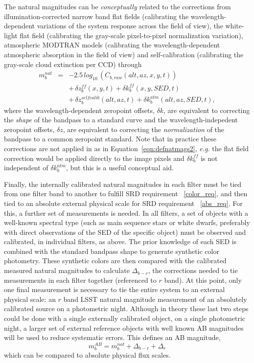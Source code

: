 \documentclass[12pt,preprint]{aastex}
\begin{document}
The natural magnitudes can be {\it conceptually} related to the corrections
from illumination-corrected narrow band flat fields (calibrating the
wavelength-dependent variations of the system response across the
field of view), the white-light flat field (calibrating the gray-scale pixel-to-pixel
normalization variation), atmospheric MODTRAN models (calibrating the
wavelength-dependent atmospheric absorption in the field of view) and
self-calibration (calibrating the gray-scale cloud extinction per CCD)
through
\begin{eqnarray}
\label{eqn:defnatmags2}
m_b^{nat} & = &-2.5 \, log_{10} \, (C_{b, raw}(alt,az,x,y,t))
\nonumber \\ 
 & & +\, \delta z_b^{ff}(x,y,t) + \delta k_b^{ff}(x,y,SED,t)  \nonumber \\  
 & &+\, \delta z_b^{selfcalib}(alt,az,t)  + \delta k_b^{atm}(alt,az,SED,t), 
\end{eqnarray}
where the wavelength-dependent zeropoint offsets, $\delta k$, are
equivalent to correcting the {\it shape} of the bandpass to a standard
curve and the wavelength-indepedent
zeropoint offsets, $\delta z$, are equivalent to
correcting the {\it normalization} of the bandpass to a common zeropoint
standard. Note that in practice these corrections are not applied in
as in Equation~\ref{eqn:defnatmags2}, {\it e.g.} the flat field
correction would be applied directly to the image pixels and $\delta
k_b^{ff}$ is not independent of $\delta k_b^{atm}$, but this is a
useful conceptual aid.

Finally, the internally calibrated natural magnitudes in each filter
must be tied from one filter band to another to fulfill SRD
requirement ~\ref{color_req}, and then tied to an absolute external
physical scale for SRD requirement ~\ref{abs_req}.  For this, a
further set of measurements is needed. In all filters, a set of
objects with a well-known spectral type (such as main sequence stars
or white dwarfs, preferably with direct observations of the SED of the
specific object) must be observed and calibrated, in individual
filters, as above. The prior knowledge of each SED is combined with
the standard bandpass shape to generate synthetic color
photometry. These synthetic colors are then compared with the
calibrated measured natural magnitudes to calculate $\Delta_{b-r}$,
the corrections needed to tie measurements in each filter together
(referenced to $r$ band).  At this point, only one final measurement
is necessary to tie the entire system to an external physical scale:
an $r$ band LSST natural magnitude measurement of an absolutely
calibrated source on a photometric night. Although in theory these
last two steps could be done with a single externally calibrated
object, on a single photometric night, a larger set of external
reference objects with well known AB magnitudes will be used to reduce
systematic errors. This defines an AB magnitude,
\begin{equation}
\label{eqn:extmags}
m_b^{AB} = m_b^{nat}  + \Delta_{b-r} + \Delta_r
\end{equation}
which can be compared to absolute physical flux scales. 
\end{document}

